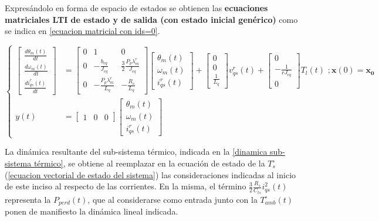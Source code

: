 \documentclass[a4paper, 10pt, onecolumn,journal]{ieeeconf}
\begin{document}
Expresándolo en forma de espacio de estados se obtienen las
\textbf{ecuaciones matriciales LTI de estado y de salida (con estado inicial genérico)}
como se indica en \cref{ecuacion matricial con ids=0}.

\begin{equation}
	\begin{cases}
		\begin{bmatrix}
			\frac{d \theta_m(t)}{dt} \\ 
			\frac{d \omega_m(t)}{dt}\\
			\frac{d i^r_{qs}(t)}{dt}  
		\end{bmatrix}
		 &= 
		 \begin{bmatrix}
		 	0 & 1 & 0 \\ 
		 	0 & - \frac{b_{eq}}{J_{eq}} & \frac{3}{2} \frac{P_p \lambda^r_m}{J_{eq}} \\
		 	0 &  - \frac{P_p  \lambda^r_m}{L_q} & -\frac{R_s}{L_q}
		 \end{bmatrix}
		 \begin{bmatrix}
		 	{\theta}_m(t) \\ 
		 	{\omega}_m(t)\\
		 	{i}^r_{qs}(t)  
		 \end{bmatrix}
		 +
		 \begin{bmatrix}
		 	0 \\ 
		 	0\\
		 	\frac{1}{L_q}  
		 \end{bmatrix}
		 v^r_{qs}(t)+
		 \begin{bmatrix}
		 	0 \\ 
		 	- \frac{1}{r J_{eq}}\\
		 	0 
		 \end{bmatrix} T_l(t)\,\,; \mathbf{x}(0) = \mathbf{x_0}\\
		 y(t) &= \begin{bmatrix}
		 		1 & 0 & 0
		 	 \end{bmatrix}
		 	 \begin{bmatrix}
		 	 	{\theta}_m(t) \\ 
		 	 	{\omega}_m(t)\\
		 	 	{i}^r_{qs}(t)
		 	 \end{bmatrix}
	\end{cases}
	\label{ecuacion matricial con ids=0}
\end{equation}

La dinámica resultante del sub-sistema térmico,
indicada en la \cref{dinamica sub-sistema térmico},
se obtiene al reemplazar en la ecuación de estado de la $T^{\circ}_s$
(\cref{ecuacion vectorial de estado del sistema}) las consideraciones indicadas al inicio de este inciso al
respecto de las corrientes. En la misma, el término $\frac{3}{2}\frac{R_{s}}{C_{ts}} i_{qs}^2(t)$ representa
la $P_{perd}(t)$, que al considerarse como entrada junto con la $T^{\circ}_{amb}(t)$ ponen de
manifiesto la dinámica lineal indicada.
\end{document}
